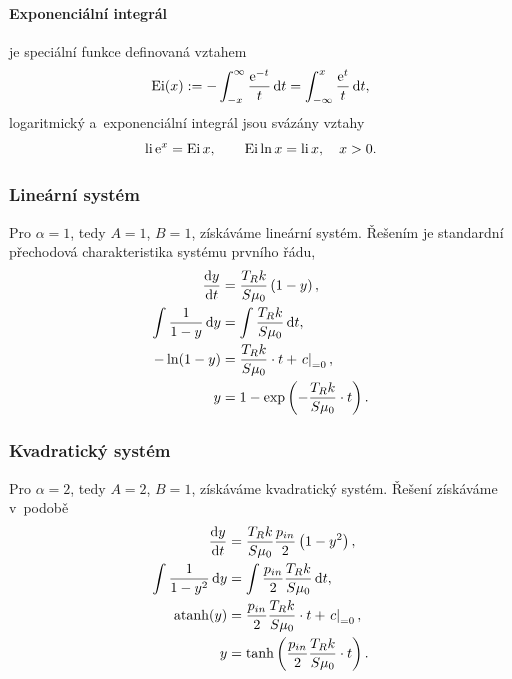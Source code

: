 \paragraph{Exponenciální integrál} je speciální funkce definovaná vztahem
\begin{equation}
    \operatorname{Ei}(x):=-\int_{-x}^{\infty}\frac{\mathrm{e}^{-t}}{t}\,\mathrm{d}{t}=\int_{-\infty}^x \frac{\mathrm{e}^{t}}{t}\,\mathrm{d}{t},
\end{equation}
logaritmický a~exponenciální integrál jsou svázány vztahy
\begin{equation}\label{eq:logarithmic_exponential_integral_relation}
    \operatorname{li} \mathrm{e}^{x} = \operatorname{Ei} x,\qquad \operatorname{Ei} \ln x = \operatorname{li} x, \quad x>0.
\end{equation}

\subsubsection{Lineární systém}\label{sss:linearni_system}
Pro $\alpha=1$, tedy $A=1$, $B=1$, získáváme lineární systém. Řešením je standardní přechodová charakteristika systému prvního řádu,
\begin{subequations}
\begin{align}
    \frac{\mathrm{d} y}{\mathrm{d} t}&=\frac{T_R k}{S \mu_0}\left(1-y\right),\\
    \int\frac{1}{1-y}\,\mathrm{d}{y}&=\int\frac{T_R k}{S \mu_0}\,\mathrm{d}{t},\\
    -\ln(1-y)&=\frac{T_R k}{S \mu_0}\cdot t+\left.c\right|_{=0},\\
    y&=1-\exp\left(-\frac{T_R k}{S \mu_0}\cdot t\right).
\end{align}
\end{subequations}

\subsubsection{Kvadratický systém}\label{sss:kvadraticky_system}
Pro $\alpha=2$, tedy $A=2$, $B=1$, získáváme kvadratický systém. Řešení získáváme v~podobě
\begin{subequations}
\begin{align}
    \frac{\mathrm{d} y}{\mathrm{d} t}&=\frac{T_R k}{S \mu_0}\frac{p_{in}}{2}\left(1-y^2\right),\\
    \int\frac{1}{1-y^2}\,\mathrm{d}{y}&=\int\frac{p_{in}}{2}\frac{T_R k}{S \mu_0}\,\mathrm{d}{t},\\
    \operatorname{atanh}(y)&=\frac{p_{in}}{2}\frac{T_R k}{S \mu_0}\cdot t+\left.c\right|_{=0},\\
    y&=\tanh\left(\frac{p_{in}}{2}\frac{T_R k}{S \mu_0}\cdot t\right).
\end{align}
\end{subequations}
